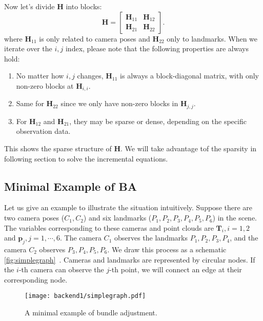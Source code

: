 Now let's divide $\mathbf{H}$ into blocks: 
\begin{equation}
	\label{eq:H-blocks}
	\mathbf{H} = \left[ {\begin{array}{*{20}{c}}
			{{\mathbf{H}_{11}}}&{{\mathbf{H}_{12}}}\\
			{{\mathbf{H}_{21}}}&{{\mathbf{H}_{22}}}
	\end{array}} \right] .
\end{equation}
where $\mathbf{H}_{11}$ is only related to camera poses and $\mathbf{H}_{22}$ only to landmarks. When we iterate over the $i,j$ index, please note that the following properties are always hold:
\begin{enumerate}
	\item No matter how $i,j$ changes, $\mathbf{H}_{11}$ is always a block-diagonal matrix, with only non-zero blocks at $\mathbf{H}_{i,i}$.
	\item Same for $\mathbf{H}_{22}$ since we only have non-zero blocks in $\mathbf{H}_{j,j}$. 
	\item  For $\mathbf{H}_{12}$ and $\mathbf{H}_{21}$, they may be sparse or dense, depending on the specific observation data.
\end{enumerate}
This shows the sparse structure of $\mathbf{H}$. We will take advantage tof the sparsity in following section to solve the incremental equations. 

\subsection{Minimal Example of BA}
Let us give an example to illustrate the situation intuitively. Suppose there are two camera poses ($C_1, C_2$) and six landmarks ($P_1, P_2, P_3, P_4, P_5, P_6$) in the scene. The variables corresponding to these cameras and point clouds are $\mathbf{T}_i, i = 1,2$ and $\mathbf{p}_j, j = 1,\cdots, 6$. The camera $C_1$ observes the landmarks $P_1, P_2, P_3, P_4$, and the camera $C_2$ observes $P_3, P_4, P_5, P_6$. We draw this process as a schematic \autoref{fig:simplegraph}~. Cameras and landmarks are represented by circular nodes. If the $i$-th camera can observe the $j$-th point, we will connect an edge at their corresponding node.

\begin{figure}[!htp]
	\centering
	\texttt{[image: backend1/simplegraph.pdf]}
	\caption{A minimal example of bundle adjustment. }
	\label{fig:simplegraph}
\end{figure}

